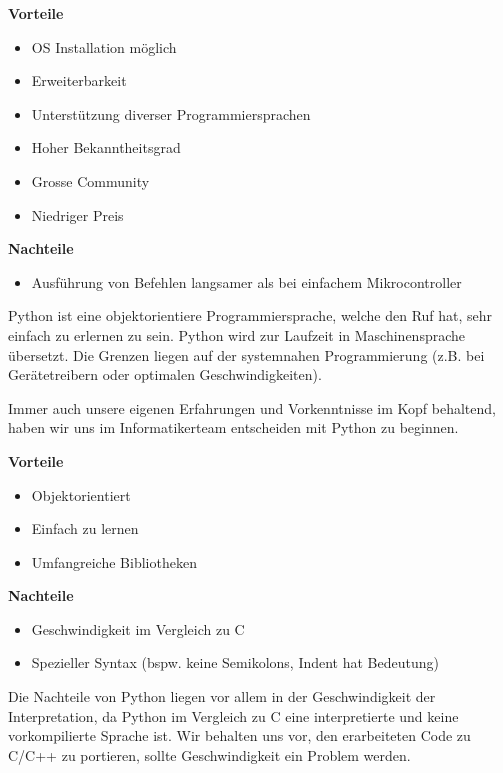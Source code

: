 \documentclass[a4paper]{report}
\begin{document}
\begin{multicols}{2}
	\textbf{Vorteile}
	\begin{itemize}[label={+},noitemsep]
		\item OS Installation möglich
		\item Erweiterbarkeit
		\item Unterstützung diverser Programmiersprachen
		\item Hoher Bekanntheitsgrad
		\item Grosse Community
		\item Niedriger Preis
	\end{itemize}
	\columnbreak
	\textbf{Nachteile}
	\begin{itemize}[label={-},noitemsep]
		\item Ausführung von Befehlen langsamer als bei einfachem Mikrocontroller
	\end{itemize}
\end{multicols}

Python ist eine objektorientiere Programmiersprache, welche den Ruf hat, sehr einfach zu erlernen zu sein. Python wird  zur Laufzeit in Maschinensprache übersetzt. Die Grenzen liegen auf der systemnahen Programmierung (z.B. bei
Gerätetreibern oder optimalen Geschwindigkeiten).

Immer auch unsere eigenen Erfahrungen und Vorkenntnisse im Kopf behaltend, haben wir uns im Informatikerteam entscheiden mit Python zu beginnen.

\begin{multicols}{2}
	\textbf{Vorteile}
	\begin{itemize}[label={+},noitemsep]
		\item Objektorientiert
		\item Einfach zu lernen
		\item Umfangreiche Bibliotheken
	\end{itemize}
	\columnbreak
	\textbf{Nachteile}
	\begin{itemize}[label={-},noitemsep]
		\item Geschwindigkeit im Vergleich zu C
		\item Spezieller Syntax (bspw. keine Semikolons, Indent hat Bedeutung)
	\end{itemize}
\end{multicols}

Die Nachteile von Python liegen vor allem in der Geschwindigkeit der Interpretation, da Python im Vergleich zu C eine interpretierte und keine vorkompilierte Sprache ist. Wir behalten uns vor, den erarbeiteten Code zu C/C++ zu portieren, sollte Geschwindigkeit ein Problem werden.
\end{document}
